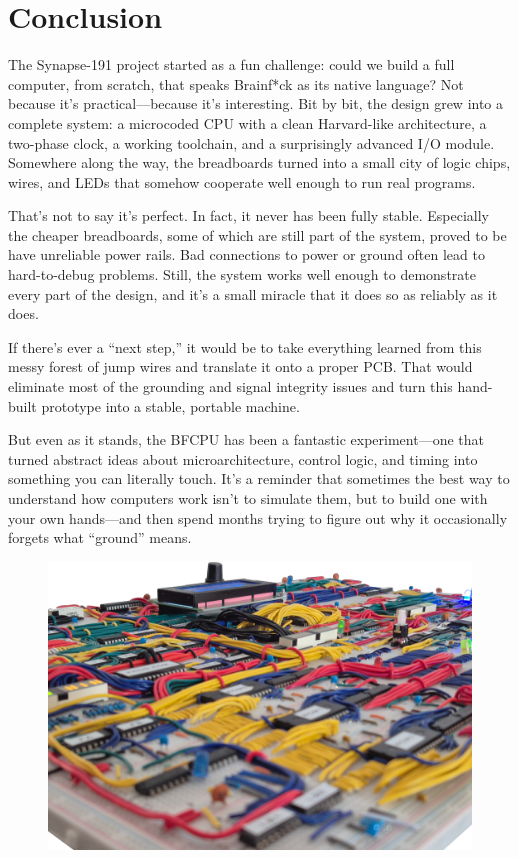 \section{Conclusion} \label{sec:conclusion}
The Synapse-191 project started as a fun challenge: could we build a full computer, from scratch, that speaks Brainf*ck as its native language? Not because it’s practical—because it’s interesting. Bit by bit, the design grew into a complete system: a microcoded CPU with a clean Harvard-like architecture, a two-phase clock, a working toolchain, and a surprisingly advanced I/O module. Somewhere along the way, the breadboards turned into a small city of logic chips, wires, and LEDs that somehow cooperate well enough to run real programs.

That’s not to say it’s perfect. In fact, it never has been fully stable. Especially the cheaper breadboards, some of which are still part of the system, proved to be have unreliable power rails. Bad connections to power or ground often lead to hard-to-debug problems. Still, the system works well enough to demonstrate every part of the design, and it’s a small miracle that it does so as reliably as it does.

If there’s ever a “next step,” it would be to take everything learned from this messy forest of jump wires and translate it onto a proper PCB. That would eliminate most of the grounding and signal integrity issues and turn this hand-built prototype into a stable, portable machine.

But even as it stands, the BFCPU has been a fantastic experiment—one that turned abstract ideas about microarchitecture, control logic, and timing into something you can literally touch. It’s a reminder that sometimes the best way to understand how computers work isn’t to simulate them, but to build one with your own hands—and then spend months trying to figure out why it occasionally forgets what “ground” means.

\mbox{}
\vfill
\begin{figure}[H]
  \centering
  \includegraphics[width=\textwidth]{img/final_img}
\end{figure}



